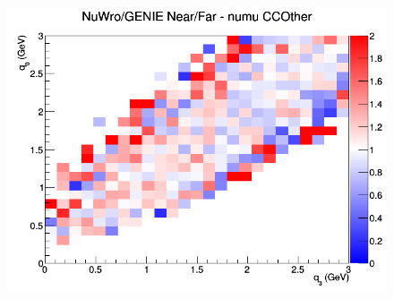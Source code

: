 \documentclass[12pt]{article}
\begin{document}
\begin{figure}[h]
\endminipage
{}
\includegraphics[width=\linewidth]{eff_q0_q3/LAr/ratios/CCOther_NuWro_GENIE_numu_NF_q3_q0.png}
\endminipage
\newline
\end{figure}
\clearpage
\end{document}
